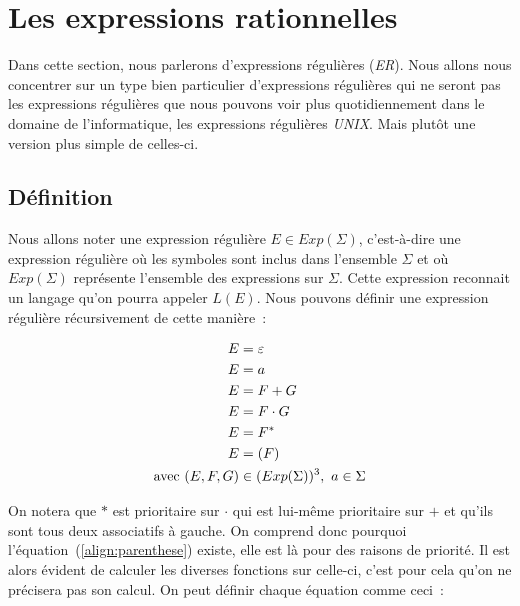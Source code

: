 \section{Les expressions rationnelles}

Dans cette section, nous parlerons d'expressions régulières (\textit{ER}). Nous
allons nous concentrer sur un type bien particulier d'expressions régulières
qui ne seront pas les expressions régulières que nous pouvons voir plus
quotidiennement dans le domaine de l'informatique, les expressions régulières
\textit{UNIX}. Mais plut\^{o}t une version plus simple de celles-ci.

\subsection{Définition}

Nous allons noter une expression régulière \(E \in Exp(\Sigma)\), c'est-à-dire
une expression régulière où les symboles sont inclus dans l'ensemble \(\Sigma\)
et où \(Exp(\Sigma)\) représente l'ensemble des expressions sur \(\Sigma\).
Cette expression reconnait un langage qu'on pourra appeler \(L(E)\). Nous
pouvons définir une expression régulière récursivement de cette manière~:

\begin{align}
    E                      & = \varepsilon                             \\
    E                      & = a                                       \\
    E                      & = F + G                                   \\
    E                      & = F \cdot G                               \\
    E                      & = F^*                                     \\
    E                      & = (F)\label{align:parenthese}             \\
    \text{avec } (E, F, G) & \in (Exp(\Sigma))^3,~ a \in \Sigma \notag
\end{align}

On notera que \(*\) est prioritaire sur \(\cdot\) qui est lui-même prioritaire
sur \(+\) et qu'ils sont tous deux associatifs à gauche. On comprend donc
pourquoi l'équation~(\ref{align:parenthese}) existe, elle est là pour des
raisons de priorité. Il est alors évident de calculer les diverses fonctions
sur celle-ci, c'est pour cela qu'on ne précisera pas son
calcul\label{subsec:parenthese}. On peut définir chaque équation comme ceci~:

